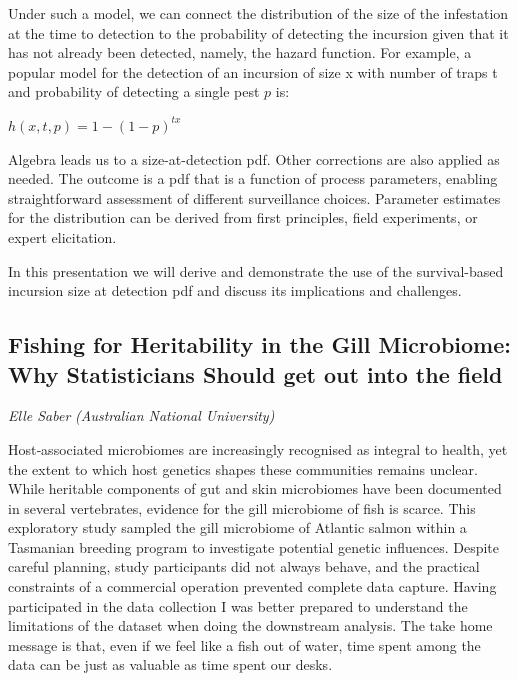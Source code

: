 \documentclass[
]{scrreprt}
\begin{document}
Under such a model, we can connect the distribution of the size of the
infestation at the time to detection to the probability of detecting the
incursion given that it has not already been detected, namely, the
hazard function. For example, a popular model for the detection of an
incursion of size x with number of traps t and probability of detecting
a single pest \(p\) is:

\(h(x,t,p) = 1 - (1 - p)^{tx}\)

Algebra leads us to a size-at-detection pdf. Other corrections are also
applied as needed. The outcome is a pdf that is a function of process
parameters, enabling straightforward assessment of different
surveillance choices. Parameter estimates for the distribution can be
derived from first principles, field experiments, or expert elicitation.

In this presentation we will derive and demonstrate the use of the
survival-based incursion size at detection pdf and discuss its
implications and challenges.

\subsection{Fishing for Heritability in the Gill Microbiome: Why
Statisticians Should get out into the
field}\label{fishing-for-heritability-in-the-gill-microbiome-why-statisticians-should-get-out-into-the-field}

\emph{Elle Saber} \emph{(Australian National
University)}

\setlength{\parskip}{0.5em}

Host‐associated microbiomes are increasingly recognised as integral to
health, yet the extent to which host genetics shapes these communities
remains unclear. While heritable components of gut and skin microbiomes
have been documented in several vertebrates, evidence for the gill
microbiome of fish is scarce. This exploratory study sampled the gill
microbiome of Atlantic salmon within a Tasmanian breeding program to
investigate potential genetic influences. Despite careful planning,
study participants did not always behave, and the practical constraints
of a commercial operation prevented complete data capture. Having
participated in the data collection I was better prepared to understand
the limitations of the dataset when doing the downstream analysis. The
take home message is that, even if we feel like a fish out of water,
time spent among the data can be just as valuable as time spent our
desks.
\end{document}
